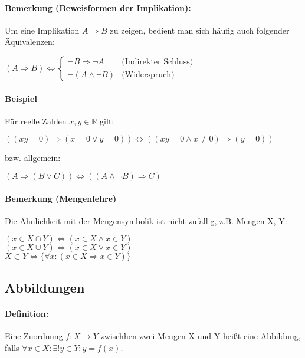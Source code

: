 \documentclass[12pt,a4paper,parskip=half-,DIV=15]{scrartcl}
\begin{document}
\paragraph{Bemerkung (Beweisformen der Implikation):}
Um eine Implikation $A\Rightarrow B$ zu zeigen, bedient man sich häufig auch folgender Äquivalenzen:

\begin{center}
$(A\Rightarrow B)\Leftrightarrow \left\{
\begin{array}{cl}
\lnot B\Rightarrow \lnot A&\text{(Indirekter Schluss)}\\

\lnot (A\land \lnot B)&\text{(Widerspruch)}
\end{array}\right.$
\end{center}
\paragraph{Beispiel} Für reelle Zahlen $x,y\in\mathbb{R}$ gilt:
\begin{center}
$\left((xy = 0)\Rightarrow (x=0 \lor y=0)\right) \Leftrightarrow \left((xy=0 \land x \neq 0)\Rightarrow (y =0)\right)$
\end{center}
bzw. allgemein:
\begin{center}
$(A\Rightarrow (B\lor C))\Leftrightarrow ((A\land\lnot B)\Rightarrow C)$
\end{center}
\paragraph{Bemerkung (Mengenlehre)} Die Ähnlichkeit mit der Mengensymbolik ist nicht zufällig, z.B. Mengen X, Y:
\begin{center}
$(x\in X\cap Y)\Leftrightarrow (x\in X\land x\in Y)$\\
$(x\in X\cup Y)\Leftrightarrow (x\in X\lor x\in Y)$\\
$X\subset Y \Leftrightarrow \{\forall x : (x\in X \Rightarrow x\in Y)\}$
\end{center}
\subsection{Abbildungen}
\paragraph{Definition:} Eine Zuordnung $f: X\to Y$ zwischhen zwei Mengen X und Y heißt eine Abbildung, falls $\forall x\in X: \exists ! y\in Y: y=f(x)$.
\end{document}
